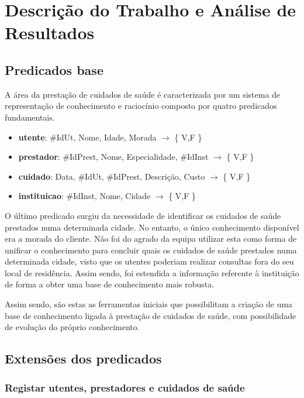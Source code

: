 \documentclass[a4paper]{article}
\begin{document}
\section{Descrição do Trabalho e Análise de Resultados}

\subsection{Predicados base}
\hspace{3mm} A área da prestação de cuidados de saúde é caracterizada por um sistema de representação de conhecimento e raciocínio composto por quatro predicados fundamentais.

\begin{itemize}
    \item \textbf{utente}: \#IdUt, Nome, Idade, Morada \( \rightarrow \) \{ V,F \} 
    \item \textbf{prestador}: \#IdPrest, Nome, Especialidade, \#IdInst \( \rightarrow \) \{ V,F \}
    \item \textbf{cuidado}: Data, \#IdUt, \#IdPrest, Descrição, Custo \( \rightarrow \) \{ V,F \}
    \item \textbf{instituicao}: \#IdInst, Nome, Cidade \( \rightarrow \) \{ V,F \}
\end{itemize}

O último predicado surgiu da necessidade de identificar os cuidados de saúde prestados numa determinada cidade. No entanto, o único conhecimento disponível era a morada do cliente. Não foi do agrado da equipa utilizar esta como forma de unificar o conhecimento para concluir quais os cuidados de saúde prestados numa determinada cidade, visto que os utentes poderiam realizar consultas fora do seu local de residência. Assim sendo, foi estendida a informação referente à instituição de forma a obter uma base de conhecimento mais robusta.

Assim sendo, são estas as ferramentas iniciais que possibilitam a criação de uma base de conhecimento ligada à prestação de cuidados de saúde, com possibilidade de evolução do próprio conhecimento.


\subsection{Extensões dos predicados}

\subsubsection{Registar utentes, prestadores e cuidados de saúde}
\end{document}
